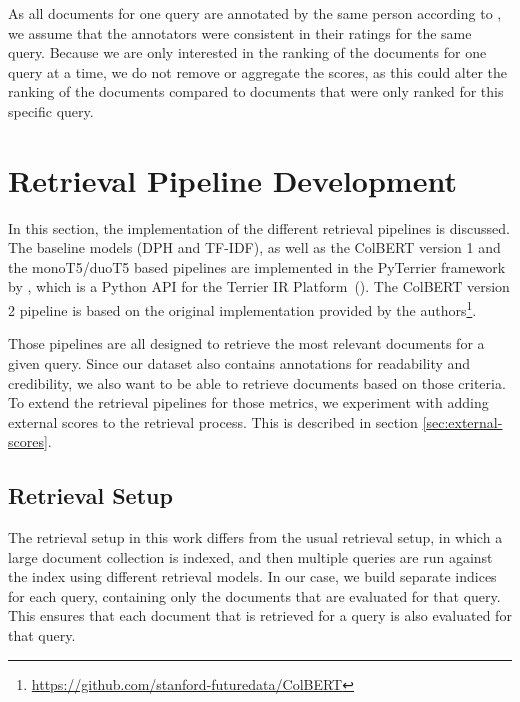 As all documents for one query are annotated by the same person according to \cite{goeuriot:2021:Consumer}, we assume that the annotators were consistent in their ratings for the same query.
Because we are only interested in the ranking of the documents for one query at a time, we do not remove or aggregate the scores, as this could alter the ranking of the documents compared to documents that were only ranked for this specific query.

\section{Retrieval Pipeline Development}
In this section, the implementation of the different retrieval pipelines is discussed.
The baseline models (DPH and TF-IDF), as well as the ColBERT version 1 and the monoT5/duoT5 based pipelines are implemented in the PyTerrier framework by \cite{pyterrier:2020:Declarative}, which is a Python API for the Terrier IR Platform~(\cite{macdonald:2012:From}).
The ColBERT version 2 pipeline is based on the original implementation provided by the authors\footnote{\url{https://github.com/stanford-futuredata/ColBERT}}.

Those pipelines are all designed to retrieve the most relevant documents for a given query.
Since our dataset also contains annotations for readability and credibility, we also want to be able to retrieve documents based on those criteria.
To extend the retrieval pipelines for those metrics, we experiment with adding external scores to the retrieval process.
This is described in section \ref{sec:external-scores}.

\subsection{Retrieval Setup}
The retrieval setup in this work differs from the usual retrieval setup, in which a large document collection is indexed, and then multiple queries are run against the index using different retrieval models.
In our case, we build separate indices for each query, containing only the documents that are evaluated for that query.
This ensures that each document that is retrieved for a query is also evaluated for that query.

